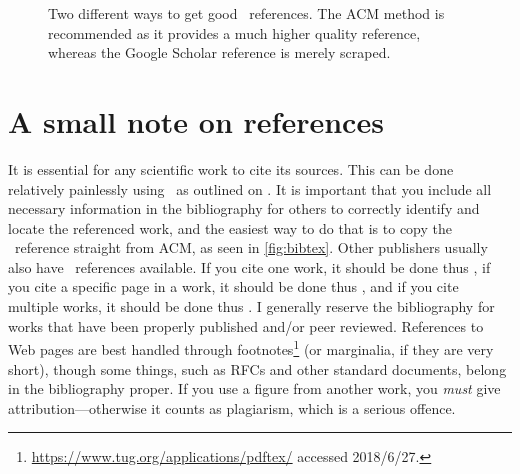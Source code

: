   \begin{sidewaysfigure}
  \centering

  

  \caption[Two different ways to get good \mBibTeX\ references]{Two different ways to get good \mBibTeX\ references. The ACM method is recommended as it provides a much higher quality reference, whereas the Google Scholar reference is merely scraped.}\label{fig:bibtex}
\end{sidewaysfigure}


\section{A small note on references}
\label{sec:small-note-refer}

It is essential for any scientific work to cite its sources. This can be
done relatively painlessly using \mBibTeX\ as outlined on
. It is important that you include all necessary
information in the bibliography for others to correctly identify and locate
the referenced work, and the easiest way to do that is to copy the \mBibTeX\
reference straight from ACM, as seen in \autoref{fig:bibtex}.  Other
publishers usually also have \mBibTeX\ references available. If you cite one
work, it should be done thus \cite{Kristensen2010:MP2P2010}, if you cite a
specific page in a work, it should be done thus
\cite[p. 410]{Chawathe2003:2003}, and if you cite multiple works, it should
be done thus
\cite{knuth:1976,knuth:1974,Kristensen2010:MP2P2010,Mittelbach2004:TLC2004}.
I generally reserve the bibliography for works that have been properly
published and/or peer reviewed. References to Web pages are best handled
through footnotes\footnote{\url{https://www.tug.org/applications/pdftex/}
  accessed 2018/6/27.} (or
marginalia, if they are very
short), though some things, such as RFCs and other standard documents,
belong in the bibliography proper. If you use a figure from another work,
you \emph{must} give attribution---otherwise it counts as plagiarism, which is
a serious offence.



